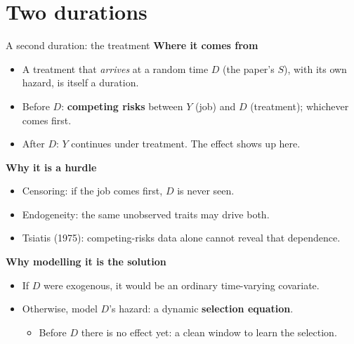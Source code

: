\documentclass[aspectratio=169,10pt]{beamer}
\begin{document}
\section{Two durations}
\begin{frame}{A second duration: the treatment}
  \textbf{Where it comes from}
  \begin{itemize}
    \item A treatment that \emph{arrives} at a random time $D$ (the paper's $S$), with its own hazard, is itself a duration.
    \item Before $D$: \textbf{competing risks} between $Y$ (job) and $D$ (treatment); whichever comes first.
    \item After $D$: $Y$ continues under treatment. The effect shows up here.
  \end{itemize}
  \textbf{Why it is a hurdle}
  \begin{itemize}
    \item Censoring: if the job comes first, $D$ is never seen.
    \item Endogeneity: the same unobserved traits may drive both.
    \item Tsiatis (1975): competing-risks data alone cannot reveal that dependence.
  \end{itemize}
  \textbf{Why modelling it is the solution}
  \begin{itemize}
    \item If $D$ were exogenous, it would be an ordinary time-varying covariate.
    \item Otherwise, model $D$'s hazard: a dynamic \textbf{selection equation}.
      \begin{itemize}
        \item Before $D$ there is no effect yet: a clean window to learn the selection.
      \end{itemize}
  \end{itemize}
\end{frame}
\end{document}
